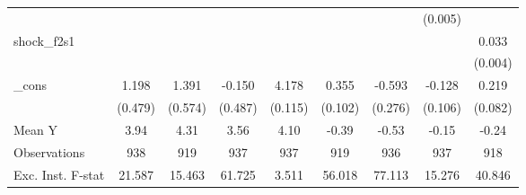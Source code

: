 {\begin{tabular}{l*{8}{c}}
            &                     &                     &                     &                     &                     &                     &     (0.005)         &                     \\
\addlinespace
shock\_f2s1  &                     &                     &                     &                     &                     &                     &                     &       0.033\sym{***}\\
            &                     &                     &                     &                     &                     &                     &                     &     (0.004)         \\
\addlinespace
\_cons      &       1.198\sym{**} &       1.391\sym{**} &      -0.150         &       4.178\sym{***}&       0.355\sym{***}&      -0.593\sym{**} &      -0.128         &       0.219\sym{**} \\
            &     (0.479)         &     (0.574)         &     (0.487)         &     (0.115)         &     (0.102)         &     (0.276)         &     (0.106)         &     (0.082)         \\
\midrule
Mean Y      &        3.94         &        4.31         &        3.56         &        4.10         &       -0.39         &       -0.53         &       -0.15         &       -0.24         \\
Observations&         938         &         919         &         937         &         937         &         919         &         936         &         937         &         918         \\
Exc. Inst. F-stat&      21.587         &      15.463         &      61.725         &       3.511         &      56.018         &      77.113         &      15.276         &      40.846         \\
\bottomrule
\end{tabular}
}
